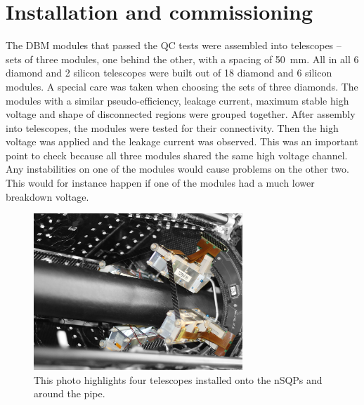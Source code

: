 \section{Installation and commissioning}
\label{sec:install}

The DBM modules that passed the QC tests were assembled into telescopes -- sets of three modules, one behind the other, with a spacing of 50~mm. All in all 6 diamond and 2 silicon telescopes were built out of 18 diamond and 6 silicon modules. A special care was taken when choosing the sets of three diamonds. The modules with a similar pseudo-efficiency, leakage current, maximum stable high voltage and shape of disconnected regions were grouped together. After assembly into telescopes, the modules were tested for their connectivity. Then the high voltage was applied and the leakage current was observed. This was an important point to check because all three modules shared the same high voltage channel. Any instabilities on one of the modules would cause problems on the other two. This would for instance happen if one of the modules had a much lower breakdown voltage.
\begin{figure}[!t]
\centering
\includegraphics[width=0.7\textwidth]{04_charge_monitoring/pics/DBM-installed-colour1}
\caption{This photo highlights four telescopes installed onto the nSQPs and around the pipe.}
\label{fig:dbminatlas1}
\end{figure}

